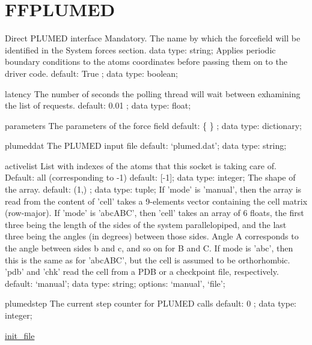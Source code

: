 \section{FFPLUMED}
\label{FFPLUMED}
\begin{ipifield}{}%
{ Direct PLUMED interface }%
{}%
{%
{Mandatory. The name by which the forcefield will be identified in the System forces section.}%
{data type: string; }%
%
{Applies periodic boundary conditions to the atoms coordinates before passing them on to the driver code.}%
{default:  True ; data type: boolean; }%
}
\begin{ipifield}{latency}%
{The number of seconds the polling thread will wait between exhamining the list of requests.}%
{default:  0.01 ; data type: float; }%
{}
\end{ipifield}
\begin{ipifield}{parameters}%
{The parameters of the force field}%
{default:  \{ \} ; data type: dictionary; }%
{}
\end{ipifield}
\begin{ipifield}{plumeddat}%
{The PLUMED input file}%
{default: `plumed.dat'; data type: string; }%
{}
\end{ipifield}
\begin{ipifield}{activelist}%
{List with indexes of the atoms that this socket is taking care of.    Default: all (corresponding to -1)}%
{default: 
      [-1]; data type: integer; }%
{%
{The shape of the array.}%
{default:  (1,) ; data type: tuple; }%
%
{If 'mode' is 'manual', then the array is read from the content of 'cell' takes a 9-elements vector containing the cell matrix (row-major). If 'mode' is 'abcABC', then 'cell' takes an array of 6 floats, the first three being the length of the sides of the system parallelopiped, and the last three being the angles (in degrees) between those sides. Angle A corresponds to the angle between sides b and c, and so on for B and C. If mode is 'abc', then this is the same as for 'abcABC', but the cell is assumed to be orthorhombic. 'pdb' and 'chk' read the cell from a PDB or a checkpoint file, respectively.}%
{default: `manual'; data type: string; options: `manual', `file'; }%
}
\end{ipifield}
\begin{ipifield}{plumedstep}%
{The current step counter for PLUMED calls}%
{default:  0 ; data type: integer; }%
{}
\end{ipifield}
\begin{ipifield}{\hyperref[INITFILE]{init\_file}}%

\end{ipifield}
\end{ipifield}
